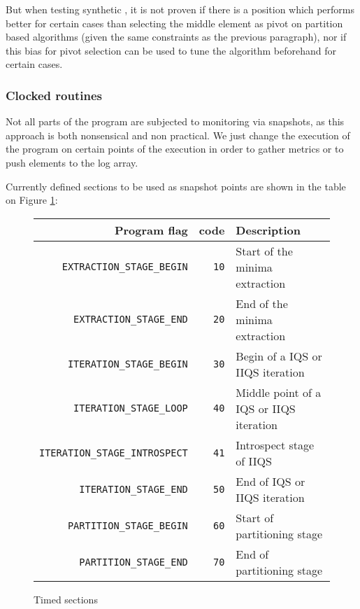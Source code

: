 But when testing synthetic , it is not proven if there is a position which performs better for certain cases than selecting the middle element as pivot on partition based algorithms (given the same constraints as the previous paragraph), nor if this bias for pivot selection can be used to tune the algorithm beforehand for certain cases.

\subsubsection{Clocked routines}
Not all parts of the program are subjected to monitoring via snapshots, as this approach is both nonsensical and non practical. We just change the execution of the program on certain points of the execution in order to gather metrics or to push elements to the log array. 

Currently defined sections to be used as snapshot points are shown in the table on Figure \ref{TABLE:POINTS}:



\begin{figure}[!ht]
    \centering
    \begin{tabularx}{\linewidth}{|r|r|X|}
        \hline
        Program flag & code & Description \\
        \hline
        \texttt{EXTRACTION\_STAGE\_BEGIN} & \texttt{10} & Start of the minima extraction\\
        \hline
        \texttt{EXTRACTION\_STAGE\_END} & \texttt{20} & End of the minima extraction \\
        \hline
        \texttt{ITERATION\_STAGE\_BEGIN} & \texttt{30} & Begin of a IQS or IIQS iteration \\
        \hline
        \texttt{ITERATION\_STAGE\_LOOP} & \texttt{40} & Middle point of a IQS or IIQS iteration \\
        \hline
        \texttt{ITERATION\_STAGE\_INTROSPECT} & \texttt{41} & Introspect stage of IIQS \\
        \hline
        \texttt{ITERATION\_STAGE\_END} & \texttt{50} & End of IQS or IIQS iteration \\
        \hline
        \texttt{PARTITION\_STAGE\_BEGIN} & \texttt{60} & Start of partitioning stage \\
        \hline
        \texttt{PARTITION\_STAGE\_END} & \texttt{70} & End of partitioning stage \\
        \hline
    \end{tabularx}
    
    \caption{Timed sections}
    \label{TABLE:POINTS}
\end{figure}



